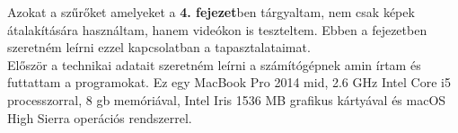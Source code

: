 
Azokat a szűrőket amelyeket a \textbf{4. fejezet}ben tárgyaltam, nem csak képek átalakítására használtam, hanem videókon is teszteltem. Ebben a fejezetben szeretném leírni ezzel kapcsolatban a tapasztalataimat. 
\\

\noindent Először a technikai adatait szeretném leírni a számítógépnek amin írtam és futtattam a programokat. Ez egy MacBook Pro  2014 mid, 2.6 GHz Intel Core i5 processzorral, 8 gb memóriával, Intel Iris 1536 MB grafikus kártyával és macOS High Sierra operációs rendszerrel.

